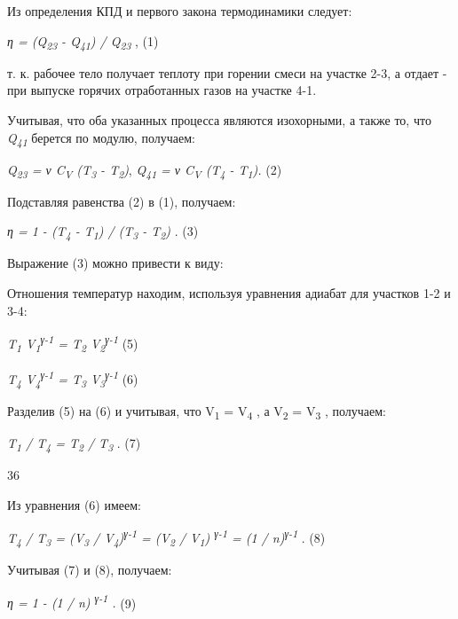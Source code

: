 \solving{}

Из определения КПД и первого закона термодинамики следует:

\emph{η = (Q\textsubscript{23} - Q\textsubscript{41}) /
Q\textsubscript{23}} , (1)

т. к. рабочее тело получает теплоту при горении смеси на участке 2-3, а
отдает - при выпуске горячих отработанных газов на участке 4-1.


Учитывая, что оба указанных процесса являются изохорными, а также то,
что \emph{Q\textsubscript{41}} берется по модулю, получаем:

\emph{Q\textsubscript{23} = ν C\textsubscript{V} (T\textsubscript{3} -
T\textsubscript{2})}, \emph{Q\textsubscript{41} = ν C\textsubscript{V}
(T\textsubscript{4} - T\textsubscript{1}).} (2)

Подставляя равенства (2) в (1), получаем:

\emph{η = 1 - (T\textsubscript{4} - T\textsubscript{1}) /
(T\textsubscript{3} - T\textsubscript{2})} . (3)

Выражение (3) можно привести к виду:


Отношения температур находим, используя уравнения адиабат для участков
1-2 и 3-4:

\emph{T\textsubscript{1} V\textsubscript{1}\textsuperscript{γ-1} =
T\textsubscript{2} V\textsubscript{2}\textsuperscript{γ-1}} (5)

\emph{T\textsubscript{4} V\textsubscript{4}\textsuperscript{γ-1} =
T\textsubscript{3} V\textsubscript{3}\textsuperscript{γ-1}} (6)

Разделив (5) на (6) и учитывая, что V\textsubscript{1} =
V\textsubscript{4} , а V\textsubscript{2} = V\textsubscript{3} ,
получаем:

\emph{T\textsubscript{1} / T\textsubscript{4} = T\textsubscript{2} /
T\textsubscript{3}} . (7)

36

Из уравнения (6) имеем:

\emph{T\textsubscript{4} / T\textsubscript{3} = (V\textsubscript{3} /
V\textsubscript{4})\textsuperscript{γ-1} = (V\textsubscript{2} /
V\textsubscript{1}) \textsuperscript{γ-1} = (1 /
n)\textsuperscript{γ-1}} . (8)

Учитывая (7) и (8), получаем:

\emph{η = 1 - (1 / n) \textsuperscript{γ-1} .} (9)

